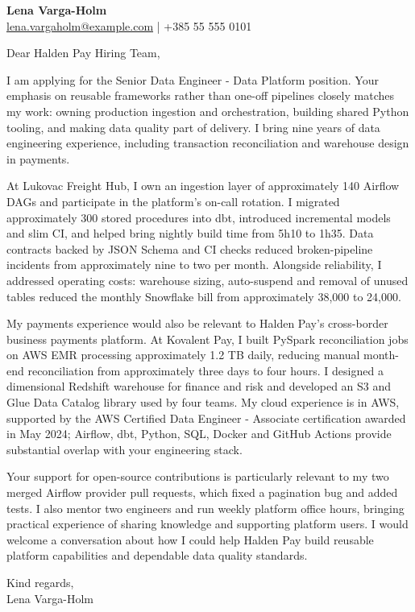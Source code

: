 \documentclass[11pt,a4paper]{article}
\begin{document}
{\large\bfseries\color{primarycolor} Lena Varga-Holm}\\
\href{mailto:lena.vargaholm@example.com}{lena.vargaholm@example.com} | +385 55 555 0101

Dear Halden Pay Hiring Team,

I am applying for the Senior Data Engineer - Data Platform position. Your emphasis on reusable frameworks rather than one-off pipelines closely matches my work: owning production ingestion and orchestration, building shared Python tooling, and making data quality part of delivery. I bring nine years of data engineering experience, including transaction reconciliation and warehouse design in payments.

At Lukovac Freight Hub, I own an ingestion layer of approximately 140 Airflow DAGs and participate in the platform's on-call rotation. I migrated approximately 300 stored procedures into dbt, introduced incremental models and slim CI, and helped bring nightly build time from 5h10 to 1h35. Data contracts backed by JSON Schema and CI checks reduced broken-pipeline incidents from approximately nine to two per month. Alongside reliability, I addressed operating costs: warehouse sizing, auto-suspend and removal of unused tables reduced the monthly Snowflake bill from approximately 38,000 to 24,000.

My payments experience would also be relevant to Halden Pay's cross-border business payments platform. At Kovalent Pay, I built PySpark reconciliation jobs on AWS EMR processing approximately 1.2 TB daily, reducing manual month-end reconciliation from approximately three days to four hours. I designed a dimensional Redshift warehouse for finance and risk and developed an S3 and Glue Data Catalog library used by four teams. My cloud experience is in AWS, supported by the AWS Certified Data Engineer - Associate certification awarded in May 2024; Airflow, dbt, Python, SQL, Docker and GitHub Actions provide substantial overlap with your engineering stack.

Your support for open-source contributions is particularly relevant to my two merged Airflow provider pull requests, which fixed a pagination bug and added tests. I also mentor two engineers and run weekly platform office hours, bringing practical experience of sharing knowledge and supporting platform users. I would welcome a conversation about how I could help Halden Pay build reusable platform capabilities and dependable data quality standards.

Kind regards,\\
Lena Varga-Holm
\end{document}
